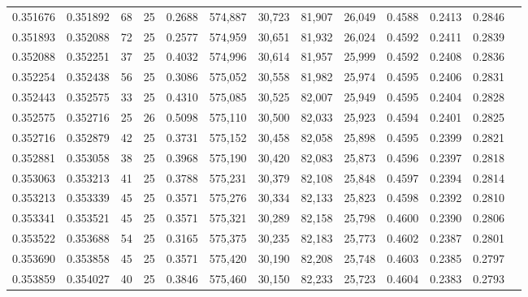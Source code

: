 \begin{tabular}{rrrrrrrrrrrrr}
0.351676 & 0.351892 &    68 &  25 &                                     0.2688 & 574,887 &  30,723 &  81,907 &  26,049 & 0.4588 & 0.2413 & 0.2846 \\
0.351893 & 0.352088 &    72 &  25 &                                     0.2577 & 574,959 &  30,651 &  81,932 &  26,024 & 0.4592 & 0.2411 & 0.2839 \\
0.352088 & 0.352251 &    37 &  25 &                                     0.4032 & 574,996 &  30,614 &  81,957 &  25,999 & 0.4592 & 0.2408 & 0.2836 \\
0.352254 & 0.352438 &    56 &  25 &                                     0.3086 & 575,052 &  30,558 &  81,982 &  25,974 & 0.4595 & 0.2406 & 0.2831 \\
0.352443 & 0.352575 &    33 &  25 &                                     0.4310 & 575,085 &  30,525 &  82,007 &  25,949 & 0.4595 & 0.2404 & 0.2828 \\
0.352575 & 0.352716 &    25 &  26 &                                     0.5098 & 575,110 &  30,500 &  82,033 &  25,923 & 0.4594 & 0.2401 & 0.2825 \\
0.352716 & 0.352879 &    42 &  25 &                                     0.3731 & 575,152 &  30,458 &  82,058 &  25,898 & 0.4595 & 0.2399 & 0.2821 \\
0.352881 & 0.353058 &    38 &  25 &                                     0.3968 & 575,190 &  30,420 &  82,083 &  25,873 & 0.4596 & 0.2397 & 0.2818 \\
0.353063 & 0.353213 &    41 &  25 &                                     0.3788 & 575,231 &  30,379 &  82,108 &  25,848 & 0.4597 & 0.2394 & 0.2814 \\
0.353213 & 0.353339 &    45 &  25 &                                     0.3571 & 575,276 &  30,334 &  82,133 &  25,823 & 0.4598 & 0.2392 & 0.2810 \\
0.353341 & 0.353521 &    45 &  25 &                                     0.3571 & 575,321 &  30,289 &  82,158 &  25,798 & 0.4600 & 0.2390 & 0.2806 \\
0.353522 & 0.353688 &    54 &  25 &                                     0.3165 & 575,375 &  30,235 &  82,183 &  25,773 & 0.4602 & 0.2387 & 0.2801 \\
0.353690 & 0.353858 &    45 &  25 &                                     0.3571 & 575,420 &  30,190 &  82,208 &  25,748 & 0.4603 & 0.2385 & 0.2797 \\
0.353859 & 0.354027 &    40 &  25 &                                     0.3846 & 575,460 &  30,150 &  82,233 &  25,723 & 0.4604 & 0.2383 & 0.2793 \\

\end{tabular}
